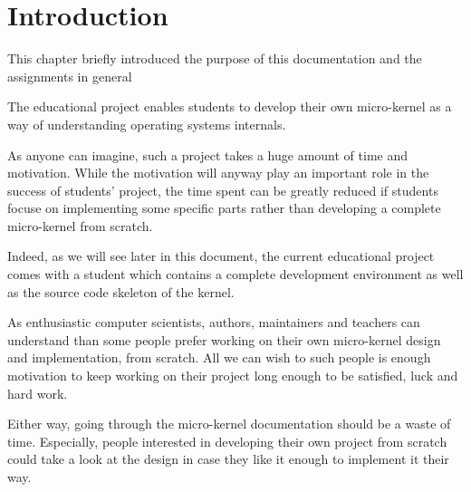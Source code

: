 %
%
%
%
%
%

%
%

\chapter{Introduction}
\label{chapter:introduction}

This chapter briefly introduced the purpose of this documentation
and the assignments in general

\newpage

%
%

The  educational project enables students to develop their own
micro-kernel as a way of understanding operating systems internals.

As anyone can imagine, such a project takes a huge amount of time and
motivation. While the motivation will anyway play an important role in the
success of students' project, the time spent can be greatly reduced if
students focuse on implementing some specific parts rather than developing a
complete micro-kernel from scratch.

Indeed, as we will see later in this document, the current 
educational project comes with a student  which contains
a complete development environment as well as the source code skeleton of
the kernel.

As enthusiastic computer scientists,  authors, maintainers and
teachers can understand than some people prefer working on their own
micro-kernel design and implementation, from scratch. All we can wish to
such people is enough motivation to keep working on their project long
enough to be satisfied, luck and hard work.

Either way, going through the  micro-kernel documentation
should be a waste of time. Especially, people interested in developing their
own project from scratch could take a look at the  design
in case they like it enough to implement it their way.

